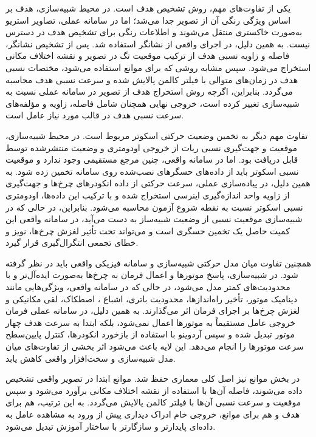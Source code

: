 یکی از تفاوت‌های مهم، روش تشخیص هدف است. در محیط شبیه‌سازی، هدف بر اساس ویژگی رنگی آن از تصویر جدا می‌شد؛ اما در سامانه عملی، تصاویر استریو به‌صورت خاکستری منتقل می‌شوند و اطلاعات رنگی برای تشخیص هدف در دسترس نیست. به همین دلیل، در اجرای واقعی از نشانگر  استفاده شد. پس از تشخیص نشانگر، فاصله و زاویه نسبی هدف از ترکیب موقعیت تگ در تصویر و نقشه اختلاف مکانی استخراج می‌شود. سپس مشابه روشی که برای موانع استفاده می‌شود، مختصات نسبی هدف در زمان‌های متوالی با فیلتر کالمن پالایش شده و سرعت نسبی هدف محاسبه می‌گردد. بنابراین، اگرچه روش استخراج هدف از تصویر در سامانه عملی نسبت به شبیه‌سازی تغییر کرده است، خروجی نهایی همچنان شامل فاصله، زاویه و مؤلفه‌های سرعت نسبی هدف در قالب مورد نیاز عامل است.

تفاوت مهم دیگر به تخمین وضعیت حرکتی اسکوتر مربوط است. در محیط شبیه‌سازی، موقعیت و جهت‌گیری نسبی ربات از خروجی اودومتری و وضعیت منتشرشده توسط  قابل دریافت بود. اما در سامانه واقعی، چنین مرجع مستقیمی وجود ندارد و موقعیت نسبی اسکوتر باید از داده‌های حسگرهای نصب‌شده روی سامانه تخمین زده شود. به همین دلیل، در پیاده‌سازی عملی، سرعت حرکتی از داده انکودرهای چرخ‌ها و جهت‌گیری از زاویه  واحد اندازه‌گیری اینرسی استخراج شده و با ترکیب این داده‌ها، اودومتری نسبی اسکوتر نسبت به نقطه شروع آزمون محاسبه می‌شود. بنابراین، در حالی که در شبیه‌سازی موقعیت نسبی از وضعیت شبیه‌ساز به دست می‌آید، در سامانه واقعی این کمیت حاصل یک تخمین حسگری است و می‌تواند تحت تأثیر لغزش چرخ‌ها، نویز  و خطای تجمعی انتگرال‌گیری قرار گیرد.

همچنین تفاوت میان مدل حرکتی شبیه‌سازی و سامانه فیزیکی واقعی باید در نظر گرفته شود. در شبیه‌سازی، پاسخ موتورها و اعمال فرمان به چرخ‌ها به‌صورت ایده‌آل‌تر و با محدودیت‌های کمتر مدل می‌شود، در حالی که در سامانه واقعی، ویژگی‌هایی مانند دینامیک موتور، تأخیر راه‌اندازها، محدودیت باتری، اشباع ، اصطکاک، لقی مکانیکی و لغزش چرخ‌ها بر اجرای فرمان اثر می‌گذارند. به همین دلیل، در سامانه عملی فرمان خروجی عامل مستقیماً به موتورها اعمال نمی‌شود، بلکه ابتدا به سرعت هدف چهار موتور تبدیل شده و سپس آردوینو با استفاده از بازخورد انکودرها، کنترل پایین‌سطح سرعت موتورها را انجام می‌دهد. این لایه باعث می‌شود اثر بخشی از تفاوت‌های میان مدل شبیه‌سازی و سخت‌افزار واقعی کاهش یابد.

در بخش موانع نیز اصل کلی معماری حفظ شد. موانع ابتدا در تصویر واقعی تشخیص داده می‌شوند، فاصله آن‌ها با استفاده از نقشه اختلاف مکانی برآورد می‌شود و سپس موقعیت و سرعت نسبی آن‌ها با فیلتر کالمن پالایش می‌گردد. به این ترتیب، هم برای هدف و هم برای موانع، خروجی خام ادراک دیداری پیش از ورود به مشاهده عامل به داده‌ای پایدارتر و سازگارتر با ساختار آموزش تبدیل می‌شود.

